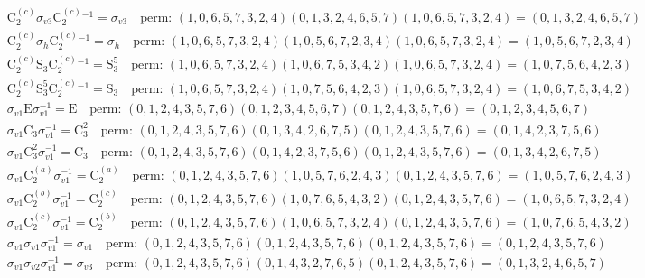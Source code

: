 \begin{align*}
& \mathrm{C}_{2}^{(c)} \sigma_{v3} \mathrm{C}_{2}^{(c)}^{-1} = \sigma_{v3} \quad \text{perm: }(1, 0, 6, 5, 7, 3, 2, 4)(0, 1, 3, 2, 4, 6, 5, 7)(1, 0, 6, 5, 7, 3, 2, 4) = (0, 1, 3, 2, 4, 6, 5, 7) \\
& \mathrm{C}_{2}^{(c)} \sigma_{h} \mathrm{C}_{2}^{(c)}^{-1} = \sigma_{h} \quad \text{perm: }(1, 0, 6, 5, 7, 3, 2, 4)(1, 0, 5, 6, 7, 2, 3, 4)(1, 0, 6, 5, 7, 3, 2, 4) = (1, 0, 5, 6, 7, 2, 3, 4) \\
& \mathrm{C}_{2}^{(c)} \mathrm{S}_{3} \mathrm{C}_{2}^{(c)}^{-1} = \mathrm{S}_{3}^{5} \quad \text{perm: }(1, 0, 6, 5, 7, 3, 2, 4)(1, 0, 6, 7, 5, 3, 4, 2)(1, 0, 6, 5, 7, 3, 2, 4) = (1, 0, 7, 5, 6, 4, 2, 3) \\
& \mathrm{C}_{2}^{(c)} \mathrm{S}_{3}^{5} \mathrm{C}_{2}^{(c)}^{-1} = \mathrm{S}_{3} \quad \text{perm: }(1, 0, 6, 5, 7, 3, 2, 4)(1, 0, 7, 5, 6, 4, 2, 3)(1, 0, 6, 5, 7, 3, 2, 4) = (1, 0, 6, 7, 5, 3, 4, 2) \\
& \sigma_{v1} \mathrm{E} \sigma_{v1}^{-1} = \mathrm{E} \quad \text{perm: }(0, 1, 2, 4, 3, 5, 7, 6)(0, 1, 2, 3, 4, 5, 6, 7)(0, 1, 2, 4, 3, 5, 7, 6) = (0, 1, 2, 3, 4, 5, 6, 7) \\
& \sigma_{v1} \mathrm{C}_{3} \sigma_{v1}^{-1} = \mathrm{C}_{3}^{2} \quad \text{perm: }(0, 1, 2, 4, 3, 5, 7, 6)(0, 1, 3, 4, 2, 6, 7, 5)(0, 1, 2, 4, 3, 5, 7, 6) = (0, 1, 4, 2, 3, 7, 5, 6) \\
& \sigma_{v1} \mathrm{C}_{3}^{2} \sigma_{v1}^{-1} = \mathrm{C}_{3} \quad \text{perm: }(0, 1, 2, 4, 3, 5, 7, 6)(0, 1, 4, 2, 3, 7, 5, 6)(0, 1, 2, 4, 3, 5, 7, 6) = (0, 1, 3, 4, 2, 6, 7, 5) \\
& \sigma_{v1} \mathrm{C}_{2}^{(a)} \sigma_{v1}^{-1} = \mathrm{C}_{2}^{(a)} \quad \text{perm: }(0, 1, 2, 4, 3, 5, 7, 6)(1, 0, 5, 7, 6, 2, 4, 3)(0, 1, 2, 4, 3, 5, 7, 6) = (1, 0, 5, 7, 6, 2, 4, 3) \\
& \sigma_{v1} \mathrm{C}_{2}^{(b)} \sigma_{v1}^{-1} = \mathrm{C}_{2}^{(c)} \quad \text{perm: }(0, 1, 2, 4, 3, 5, 7, 6)(1, 0, 7, 6, 5, 4, 3, 2)(0, 1, 2, 4, 3, 5, 7, 6) = (1, 0, 6, 5, 7, 3, 2, 4) \\
& \sigma_{v1} \mathrm{C}_{2}^{(c)} \sigma_{v1}^{-1} = \mathrm{C}_{2}^{(b)} \quad \text{perm: }(0, 1, 2, 4, 3, 5, 7, 6)(1, 0, 6, 5, 7, 3, 2, 4)(0, 1, 2, 4, 3, 5, 7, 6) = (1, 0, 7, 6, 5, 4, 3, 2) \\
& \sigma_{v1} \sigma_{v1} \sigma_{v1}^{-1} = \sigma_{v1} \quad \text{perm: }(0, 1, 2, 4, 3, 5, 7, 6)(0, 1, 2, 4, 3, 5, 7, 6)(0, 1, 2, 4, 3, 5, 7, 6) = (0, 1, 2, 4, 3, 5, 7, 6) \\
& \sigma_{v1} \sigma_{v2} \sigma_{v1}^{-1} = \sigma_{v3} \quad \text{perm: }(0, 1, 2, 4, 3, 5, 7, 6)(0, 1, 4, 3, 2, 7, 6, 5)(0, 1, 2, 4, 3, 5, 7, 6) = (0, 1, 3, 2, 4, 6, 5, 7) \\

\end{align*}
